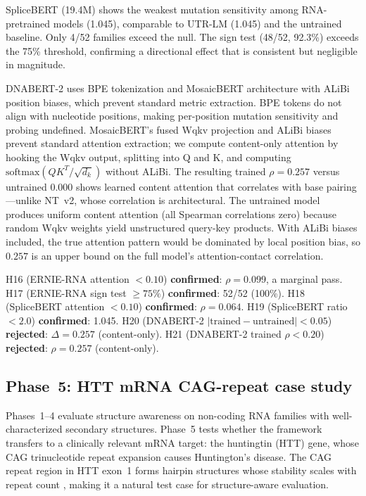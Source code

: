 \documentclass[11pt]{article}
\begin{document}
SpliceBERT (19.4M) shows the weakest mutation sensitivity among
RNA-pretrained models (1.045), comparable to UTR-LM (1.045) and the
untrained baseline.  Only 4/52 families exceed the null.  The sign
test (48/52, 92.3\%) exceeds the 75\% threshold, confirming a
directional effect that is consistent but negligible in magnitude.

DNABERT-2 uses BPE tokenization and MosaicBERT architecture with
ALiBi position biases, which prevent standard metric extraction.  BPE
tokens do not align with nucleotide positions, making per-position
mutation sensitivity and probing undefined.  MosaicBERT's fused Wqkv
projection and ALiBi biases prevent standard attention extraction;
we compute content-only attention by hooking the Wqkv output,
splitting into Q and K, and computing $\mathrm{softmax}(QK^T / \sqrt{d_k})$
without ALiBi.  The resulting trained $\rho = 0.257$ versus untrained
$0.000$ shows learned content attention that correlates with base
pairing---unlike NT~v2, whose correlation is architectural.  The
untrained model produces uniform content attention (all Spearman
correlations zero) because random Wqkv weights yield unstructured
query-key products.  With ALiBi biases included, the true attention
pattern would be dominated by local position bias, so $0.257$ is an
upper bound on the full model's attention-contact correlation.

H16 (ERNIE-RNA attention $< 0.10$) \textbf{confirmed}: $\rho =
0.099$, a marginal pass.  H17 (ERNIE-RNA sign test $\geq 75\%$)
\textbf{confirmed}: 52/52 (100\%).  H18 (SpliceBERT attention $<
0.10$) \textbf{confirmed}: $\rho = 0.064$.  H19 (SpliceBERT ratio
$< 2.0$) \textbf{confirmed}: 1.045.  H20 (DNABERT-2
$|\text{trained} - \text{untrained}| < 0.05$) \textbf{rejected}:
$\Delta = 0.257$ (content-only).  H21 (DNABERT-2 trained $\rho <
0.20$) \textbf{rejected}: $\rho = 0.257$ (content-only).


\subsection{Phase~5: HTT mRNA CAG-repeat case study}
\label{sec:phase5}

Phases~1--4 evaluate structure awareness on non-coding RNA families
with well-characterized secondary structures.  Phase~5 tests
whether the framework transfers to a clinically relevant mRNA target:
the huntingtin (HTT) gene, whose CAG trinucleotide repeat expansion
causes Huntington's disease.  The CAG repeat region in HTT exon~1
forms hairpin structures whose stability scales with repeat count
\citep{demezer2011mutant,krzyzosiak2012triplet}, making it a natural
test case for structure-aware evaluation.
\end{document}
